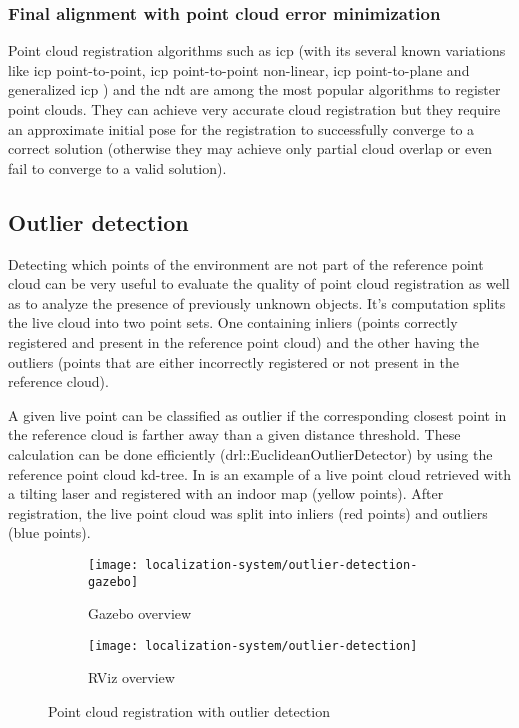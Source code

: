 \subsubsection{Final alignment with point cloud error minimization}

Point cloud registration algorithms such as \gls{icp} \cite{Besl1992a} (with its several known variations \cite{Rusinkiewicz2001,Pomerleau2013} like \gls{icp} point-to-point, \gls{icp} point-to-point non-linear, \gls{icp} point-to-plane and generalized \gls{icp} \cite{Segal2009}) and the \gls{ndt} \cite{Magnusson2009} are among the most popular algorithms to register point clouds. They can achieve very accurate cloud registration but they require an approximate initial pose for the registration to successfully converge to a correct solution (otherwise they may achieve only partial cloud overlap or even fail to converge to a valid solution).


\subsection{Outlier detection}

Detecting which points of the environment are not part of the reference point cloud can be very useful to evaluate the quality of point cloud registration as well as to analyze the presence of previously unknown objects. It's computation splits the live cloud into two point sets. One containing inliers (points correctly registered and present in the reference point cloud) and the other having the outliers (points that are either incorrectly registered or not present in the reference cloud).

A given live point can be classified as outlier if the corresponding closest point in the reference cloud is farther away than a given distance threshold. These calculation can be done efficiently (drl::EuclideanOutlierDetector) by using the reference point cloud kd-tree. In  is an example of a live point cloud retrieved with a tilting laser and registered with an indoor map (yellow points). After registration, the live point cloud was split into inliers (red points) and outliers (blue points).


\begin{figure}
	\centering
	\begin{subfigure}[ht]{0.49\textwidth}
		\centering
		\texttt{[image: localization-system/outlier-detection-gazebo]}
		\caption{Gazebo overview}
	\end{subfigure}
	\begin{subfigure}[ht]{0.49\textwidth}
		\centering
		\texttt{[image: localization-system/outlier-detection]}
		\caption{RViz overview}
	\end{subfigure}\hfill
	\caption{Point cloud registration with outlier detection}
	\label{fig:localization-system_outlier-detection}
\end{figure}



